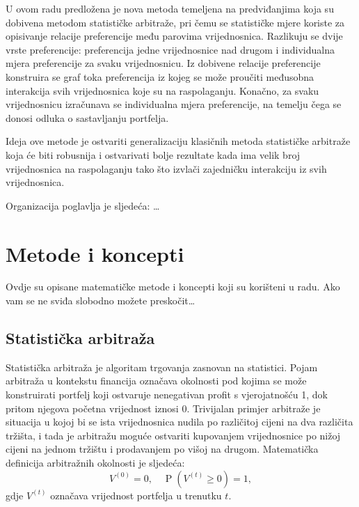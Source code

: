 \documentclass[lmodern, utf8, diplomski, numeric]{fer}
\newcommand{\prob}[1]{\operatorname{P}\left(#1\right)}
\begin{document}
  U ovom radu predložena je nova metoda temeljena na predviđanjima koja su dobivena metodom statističke arbitraže, pri čemu se statističke mjere koriste za opisivanje relacije preferencije među parovima vrijednosnica.
  Razlikuju se dvije vrste preferencije: preferencija jedne vrijednosnice nad drugom i individualna mjera preferencije za svaku vrijednosnicu.
  Iz dobivene relacije preferencije konstruira se graf toka preferencija iz kojeg se može proučiti međusobna interakcija svih vrijednosnica koje su na raspolaganju.
  Konačno, za svaku vrijednosnicu izračunava se individualna mjera preferencije, na temelju čega se donosi odluka o sastavljanju portfelja.
  
  Ideja ove metode je ostvariti generalizaciju klasičnih metoda statističke arbitraže koja će biti robusnija i ostvarivati bolje rezultate kada ima velik broj vrijednosnica na raspolaganju tako što izvlači zajedničku interakciju iz svih vrijednosnica.
  
  Organizacija poglavlja je sljedeća: \ldots

\chapter{Metode i koncepti}
  Ovdje su opisane matematičke metode i koncepti koji su korišteni u radu.
  Ako vam se ne sviđa slobodno možete preskočit\ldots

  \section{Statistička arbitraža}
  Statistička arbitraža  je algoritam trgovanja zasnovan na statistici.
  Pojam arbitraža u kontekstu financija označava okolnosti pod kojima se može konstruirati portfelj koji ostvaruje nenegativan profit s vjerojatnošću 1, dok pritom njegova početna vrijednost iznosi 0.
  Trivijalan primjer arbitraže je situacija u kojoj bi se ista vrijednosnica nudila po različitoj cijeni na dva različita tržišta, i tada je arbitražu moguće ostvariti kupovanjem vrijednosnice po nižoj cijeni na jednom tržištu i prodavanjem po višoj na drugom.
  Matematička definicija arbitražnih okolnosti je sljedeća:
  \begin{equation}
  \label{eq:statarb}
  V^{(0)} = 0, \quad \prob{V^{\left(t\right)} \ge 0} = 1,
  \end{equation}
  gdje $V^{\left(t\right)}$ označava vrijednost portfelja u trenutku $t$.
\end{document}
